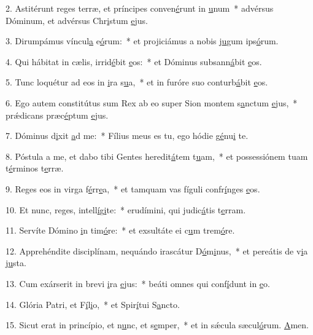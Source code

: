 2. Astitérunt reges terræ, et príncipes conven\uline{é}runt in \uline{u}num~* advérsus Dóminum, et advérsus Chr\uline{i}stum \uline{e}jus.\par 
3. Dirumpámus víncul\uline{a} e\uline{ó}rum:~* et projiciámus a nobis j\uline{u}gum ips\uline{ó}rum.\par 
4. Qui hábitat in cælis, irrid\uline{é}bit \uline{e}os:~* et Dóminus subsann\uline{á}bit \uline{e}os.\par 
5. Tunc loquétur ad eos in \uline{i}ra s\uline{u}a,~* et in furóre suo conturb\uline{á}bit \uline{e}os.\par 
6. Ego autem constitútus sum Rex ab eo super Sion montem s\uline{a}nctum \uline{e}jus,~* prǽdicans præc\uline{é}ptum \uline{e}jus.\par 
7. Dóminus d\uline{i}xit \uline{a}d me:~* Fílius meus es tu, ego hódie g\uline{é}nu\uline{i} te.\par 
8. Póstula a me, et dabo tibi Gentes heredit\uline{á}tem t\uline{u}am,~* et possessiónem tuam t\uline{é}rminos t\uline{e}rræ.\par 
9. Reges eos in virga f\uline{é}rr\uline{e}a,~* et tamquam vas fíguli confr\uline{í}nges \uline{e}os.\par 
10. Et nunc, reges, intell\uline{í}g\uline{i}te:~* erudímini, qui judic\uline{á}tis t\uline{e}rram.\par 
11. Servíte Dómino \uline{i}n tim\uline{ó}re:~* et exsultáte ei c\uline{u}m trem\uline{ó}re.\par 
12. Apprehéndite disciplínam, nequándo irascátur D\uline{ó}m\uline{i}nus,~* et pereátis de v\uline{i}a j\uline{u}sta.\par 
13. Cum exárserit in brevi \uline{i}ra \uline{e}jus:~* beáti omnes qui conf\uline{í}dunt in \uline{e}o.\par 
14. Glória Patri, et F\uline{í}l\uline{i}o,~* et Spir\uline{í}tui S\uline{a}ncto.\par 
15. Sicut erat in princípio, et n\uline{u}nc, et s\uline{e}mper,~* et in sǽcula sæcul\uline{ó}rum. \uline{A}men.\par 
